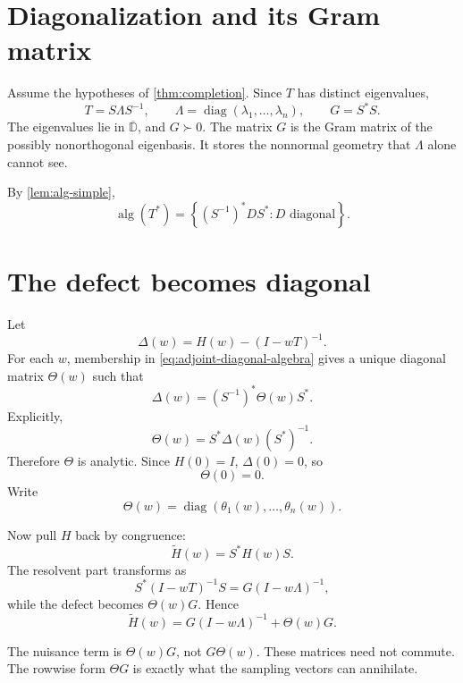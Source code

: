 \documentclass[11pt,oneside,openany]{book}
\theoremstyle{definition}
\theoremstyle{remark}
\newcommand{\D}{\mathbb D}
\newcommand{\alg}{\operatorname{alg}}
\newcommand{\diag}{\operatorname{diag}}
\newcommand{\set}[1]{\left\{#1\right\}}
\newcommand{\olD}{\overline{\D}}
\begin{document}
\section{Diagonalization and its Gram matrix}

Assume the hypotheses of \cref{thm:completion}.  Since \(T\) has
distinct eigenvalues,
\begin{equation}
  T=S\Lambda S^{-1},
  \qquad
  \Lambda=\diag(\lambda_1,\ldots,\lambda_n),
  \qquad
  G=S^*S.
  \label{eq:T-diagonalization}
\end{equation}
The eigenvalues lie in \(\olD\), and \(G\succ0\).
The matrix \(G\) is the Gram matrix of the possibly nonorthogonal
eigenbasis.  It stores the nonnormal geometry that \(\Lambda\) alone
cannot see.

By \cref{lem:alg-simple},
\begin{equation}
  \alg(T^*)=
  \set{(S^{-1})^*DS^*:D\text{ diagonal}}.
  \label{eq:adjoint-diagonal-algebra}
\end{equation}

\section{The defect becomes diagonal}

Let
\[
  \Delta(w)=H(w)-(I-wT)^{-1}.
\]
For each \(w\), membership in \eqref{eq:adjoint-diagonal-algebra}
gives a unique diagonal matrix \(\Theta(w)\) such that
\[
  \Delta(w)=(S^{-1})^*\Theta(w)S^*.
\]
Explicitly,
\[
  \Theta(w)=S^*\Delta(w)(S^*)^{-1}.
\]
Therefore \(\Theta\) is analytic.  Since \(H(0)=I\),
\(\Delta(0)=0\), so
\begin{equation}
  \Theta(0)=0.
  \label{eq:Theta-zero}
\end{equation}
Write
\[
  \Theta(w)=\diag(\theta_1(w),\ldots,\theta_n(w)).
\]

Now pull \(H\) back by congruence:
\[
  \widetilde H(w)=S^*H(w)S.
\]
The resolvent part transforms as
\[
  S^*(I-wT)^{-1}S
  =G(I-w\Lambda)^{-1},
\]
while the defect becomes \(\Theta(w)G\).  Hence
\begin{equation}
  \widetilde H(w)
  =G(I-w\Lambda)^{-1}+\Theta(w)G.
  \label{eq:Htilde}
\end{equation}

\begin{pitfall}
The nuisance term is \(\Theta(w)G\), not \(G\Theta(w)\).  These
matrices need not commute.  The rowwise form \(\Theta G\) is exactly
what the sampling vectors can annihilate.
\end{pitfall}
\end{document}
